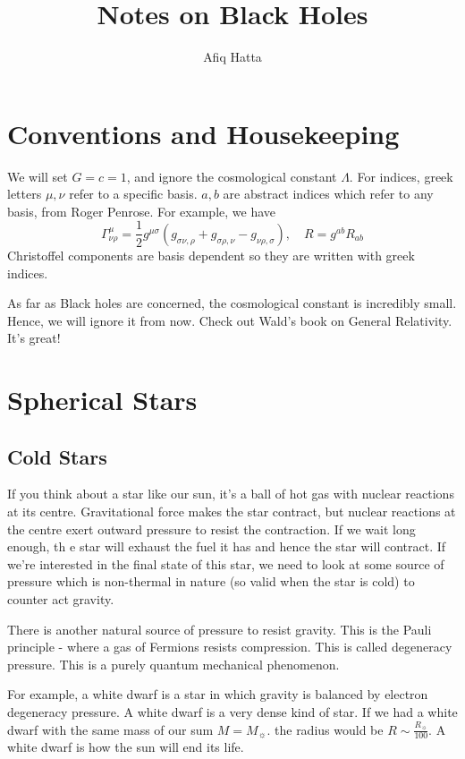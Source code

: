 \documentclass[11pt, oneside]{article}   	%
\title{Notes on Black Holes}
\author{Afiq Hatta }
\theoremstyle{slanted}
\begin{document}
 
\maketitle
\tableofcontents

\section*{Conventions and Housekeeping}
We will set $ G  = c = 1 $, 
and ignore the cosmological constant $ \Lambda $. 
For indices, greek letters $ \mu , \nu $ refer to 
a specific basis. 
$ a, b$ are abstract indices which refer to any basis, 
from Roger Penrose. 
For example, we have 
\[
\Gamma^ \mu _{ \nu \rho }  = \frac{1}{2 }g ^{ \mu \sigma } 
\left( g _{ \sigma \nu , \rho } + g _{ \sigma \rho , \nu }  - g _{ \nu \rho , \sigma }  \right), 
\quad R  = g ^{ ab } R _{ ab } 
\] Christoffel components are 
basis dependent so they are written with greek indices. 


As far as Black holes are concerned, 
the cosmological constant is incredibly small. 
Hence, we will ignore it from now. 
Check out Wald's book on General Relativity. It's great!

\section{Spherical Stars}
\subsection{Cold Stars}
If you think about a star like our sun, 
it's a ball of hot gas with nuclear reactions at its centre. 
Gravitational force makes the star contract, 
but nuclear reactions at the centre exert outward pressure 
to resist the contraction. 
If we wait long enough, th e star will exhaust the fuel 
it has and hence the star will contract. 
If we're interested in the final state of this star, 
we need to look at some source of pressure which is non-thermal in nature 
(so valid when the star is cold) to counter act gravity. 

There is another natural source of pressure to resist gravity. 
This is the Pauli principle - where a gas of Fermions 
resists compression. This is called degeneracy pressure. 
This is a purely quantum mechanical phenomenon. 

For example, a white dwarf is a star in which gravity is balanced 
by electron degeneracy pressure. 
A white dwarf is a very dense kind of star. If we 
had a white dwarf with the same mass of our sum $ M  = M _{ \sun } $. 
the radius would be $ R \sim \frac{R_{\sun } }{100 } $. 
A white dwarf is how the sun will end its life. 
\end{document}

